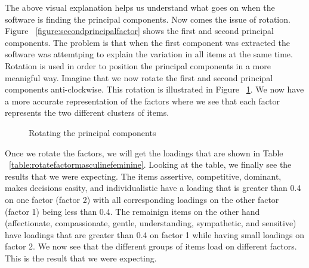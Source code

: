 \documentclass[a4paper,12pt,oneside]{book}
\begin{document}
The above visual explanation helps us understand what goes on when the software is finding the principal components. Now comes the issue of rotation.
Figure ~\ref{figure:secondprincipalfactor} shows the first and second principal components. The problem is that when the first component was extracted
the software was attemtping to explain the variation in all items at the same time. Rotation is used in order to position the principal components
in a more meanigful way. Imagine that we now rotate the first and second principal components anti-clockwise. This rotation is illustrated in 
Figure ~\ref{figure:rotate}. We now have a more accurate representation of the factors where we see that each factor represents the two different 
clusters of items. 

\begin{figure}[!h]
\centering
{} 
\caption{Rotating the principal components}
\label{figure:rotate}
\end{figure} 

Once we rotate the factors, we will get the loadings that are shown in Table ~\ref{table:rotatefactormasculinefeminine}. Looking at the table, we
finally see the results that we were expecting. The items assertive, competitive, dominant, makes decisions easity, and individualistic have a
loading that is greater than 0.4 on one factor (factor 2) with all corresponding loadings on the other factor (factor 1) being less than 0.4. The remainign items on the
other hand (affectionate, compassionate, gentle, understanding, sympathetic, and sensitive) have loadings that are greater than 0.4 on factor 1 while
having small loadings on factor 2. We now see that the different groups of items load on different factors. This is the result that we were
expecting.  
\end{document}
